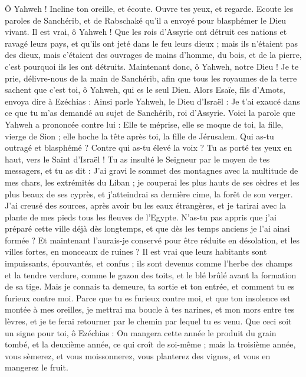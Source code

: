 \begin{multicols}{2}
Ô Yahweh ! Incline ton oreille, et écoute. Ouvre tes yeux, et regarde. Ecoute les paroles de Sanchérib, et de Rabschaké qu’il a envoyé pour blasphémer le Dieu vivant.
Il est vrai, ô Yahweh ! Que les rois d’Assyrie ont détruit ces nations et ravagé leurs pays,
et qu’ils ont jeté dans le feu leurs dieux ; mais ils n’étaient pas des dieux, mais c’étaient des ouvrages de mains d’homme, du bois, et de la pierre, c’est pourquoi ils les ont détruits.
Maintenant donc, ô Yahweh, notre Dieu ! Je te prie, délivre-nous de la main de Sanchérib, afin que tous les royaumes de la terre sachent que c’est toi, ô Yahweh, qui es le seul Dieu.
Alors Esaïe, fils d’Amots, envoya dire à Ezéchias : Ainsi parle Yahweh, le Dieu d’Israël : Je t’ai exaucé dans ce que tu m’as demandé au sujet de Sanchérib, roi d’Assyrie.
Voici la parole que Yahweh a prononcée contre lui : Elle te méprise, elle se moque de toi, la fille, vierge de Sion ; elle hoche la tête après toi, la fille de Jérusalem.
Qui as-tu outragé et blasphémé ? Contre qui as-tu élevé la voix ? Tu as porté tes yeux en haut, vers le Saint d’Israël !
Tu as insulté le Seigneur par le moyen de tes messagers, et tu as dit : J’ai gravi le sommet des montagnes avec la multitude de mes chars, les extrémités du Liban ; je couperai les plus hauts de ses cèdres et les plus beaux de ses cyprès, et j’atteindrai sa dernière cime, la forêt de son verger.
J’ai creusé des sources, après avoir bu les eaux étrangères, et je tarirai avec la plante de mes pieds tous les fleuves de l’Egypte.
N’as-tu pas appris que j’ai préparé cette ville déjà dès longtemps, et que dès les temps anciens je l’ai ainsi formée ? Et maintenant l’aurais-je conservé pour être réduite en désolation, et les villes fortes, en monceaux de ruines ?
Il est vrai que leurs habitants sont impuissants, épouvantés, et confus ; ils sont devenus comme l’herbe des champs et la tendre verdure, comme le gazon des toits, et le blé brûlé avant la formation de sa tige.
Mais je connais ta demeure, ta sortie et ton entrée, et comment tu es furieux contre moi.
Parce que tu es furieux contre moi, et que ton insolence est montée à mes oreilles, je mettrai ma boucle à tes narines, et mon mors entre tes lèvres, et je te ferai retourner par le chemin par lequel tu es venu.
Que ceci soit un signe pour toi, ô Ezéchias : On mangera cette année le produit du grain tombé, et la deuxième année, ce qui croît de soi-même ; mais la troisième année, vous sèmerez, et vous moissonnerez, vous planterez des vignes, et vous en mangerez le fruit.

\end{multicols}

